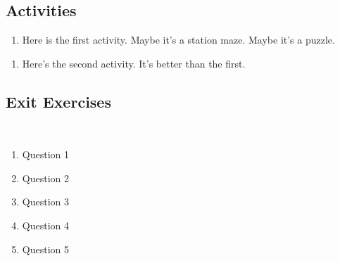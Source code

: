 \newpage

\subsection*{Activities} \label{activities-exponential-graph}

\begin{myActivity}
\begin{enumerate}
	\item Here is the first activity. Maybe it's a station maze. Maybe it's a puzzle.
	\vfill
\end{enumerate}
\end{myActivity}

\begin{myActivity}
\begin{enumerate}
	\item Here's the second activity. It's better than the first.
	\vfill
\end{enumerate}
\end{myActivity}



 \newpage

\subsection*{Exit Exercises} \label{exit-exponential-graph}

~


\begin{myExit}
	\begin{enumerate}
		\item Question 1
		\vfill
		\item Question 2
		\vfill
		\item Question 3
		\vfill
		\item Question 4
		\vfill
		\item Question 5
		\vfill
	\end{enumerate}
\end{myExit}
\vfill































